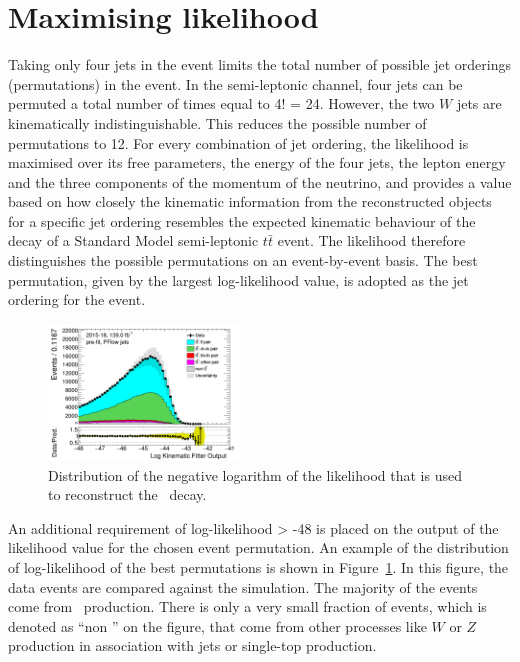 \section{Maximising likelihood}
\label{maximise likelihood}
Taking only four jets in the event limits the total number of possible 
jet orderings (permutations) in the event. In the semi-leptonic channel, 
four jets can be permuted a total number of times equal to 4! = 24. 
However, the two $W$ jets are kinematically indistinguishable. 
This reduces the possible number of permutations to 12. 
For every combination of jet ordering, 
the likelihood is maximised over 
its free parameters, the energy of the four jets, the lepton energy and 
the three components of the momentum of the neutrino, and provides a 
value based on how closely the kinematic information from the reconstructed 
objects for a specific jet ordering resembles the expected kinematic behaviour 
of the decay of a Standard Model semi-leptonic $t\bar{t}$ event. The likelihood 
therefore distinguishes the possible permutations on an event-by-event basis. 
The best permutation, given by the largest log-likelihood value, is adopted 
as the jet ordering for the event. 
\begin{figure}[bth]
	\centering
	\includegraphics[width=0.45\textwidth]{FTAG_plots/pretagNoRwwithhighpTPFlowall/DataMC_h_LLR.png}
	\caption{Distribution of  the negative logarithm of the likelihood that
	is used to reconstruct the \ttbar\ decay.}
	\label{fig:llr}
\end{figure}
An additional requirement of log-likelihood > -48 is 
placed on the output of the likelihood value for the chosen event permutation. 
An example of the distribution of log-likelihood of the best permutations 
is shown in Figure~\ref{fig:llr}. 
In this figure, the data events are compared against the simulation.
The majority of the events come from \ttbar\ production. There is only
a very small fraction of events, which is denoted as ``non \ttbar''
on the figure, that come from other processes like $W$ or $Z$ production
in association with jets or single-top production.


